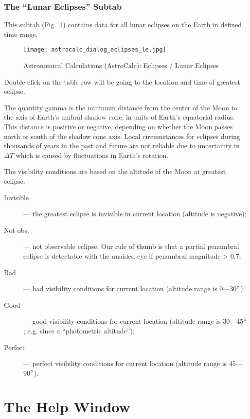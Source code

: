 \subsubsection{The ``Lunar Eclipses'' Subtab}
\label{sec:gui:AstroCalc:Eclipses:LunarEclipses}

This subtab (Fig.~\ref{fig:gui:AstroCalc:Eclipses:LunarEclipses}) contains data for all lunar eclipses on the Earth in defined time range.

\begin{figure}[tbp]
\centering\texttt{[image: astrocalc\_dialog\_eclipses\_le.jpg]}
\caption{Astronomical Calculations (AstroCalc): Eclipses / Lunar Eclipses}
\label{fig:gui:AstroCalc:Eclipses:LunarEclipses}
\end{figure}

Double click on the table row will be going to the location and time of greatest eclipse.

The quantity gamma is the minimum distance from the center of the Moon to the axis of Earth’s umbral shadow cone, in units of Earth’s equatorial radius. This distance is positive or negative, depending on whether the Moon passes north or south of the shadow cone axis. Local circumstances for eclipses during thousands of years in the past and future are not reliable due to uncertainty in $\Delta T$ which is caused by fluctuations in Earth's rotation.

The visibility conditions are based on the altitude of the Moon at greatest eclipse:
\begin{description}
  \item[Invisible] --- the greatest eclipse is invisible in current location (altitude is negative);
  \item[Not obs.] --- not observable eclipse. Our rule of thumb is that a partial penumbral eclipse is detectable with the unaided eye if penumbral magnitude > 0.7;
  \item[Bad] --- bad visibility conditions for current location (altitude range is 0---30$\degree$);
  \item[Good] --- good visibility conditions for current location (altitude range is 30---45$\degree$; e.g. since a ``photometric altitude'');
  \item[Perfect] --- perfect visibility conditions for current location (altitude range is 45---90$\degree$).
\end{description}

\section{The Help Window}
\label{sec:gui:help}

